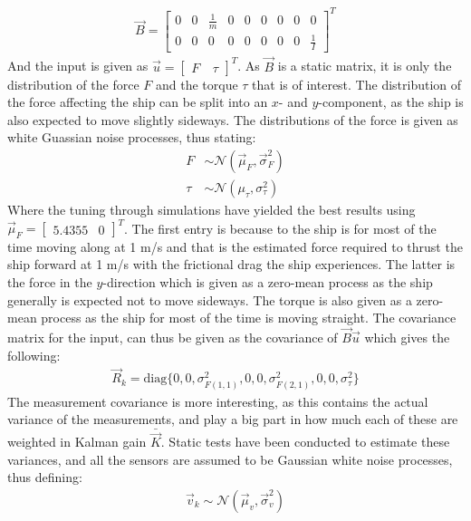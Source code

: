 \documentclass{ifacconf}
\begin{document}
\begin{align}
\vec{B} = \begin{bmatrix}
0 & 0 & \frac{1}{m} & 0 & 0 & 0 & 0 & 0 & 0\\
0 & 0 & 0 & 0 & 0 & 0 & 0 & 0 & \frac{1}{I} \end{bmatrix}^T
\end{align} 
And the input is given as $\vec{u} = \begin{bmatrix}F\ & \tau\end{bmatrix}^T$. As $\vec{B}$ is a static matrix, it is only the distribution of the force $F$ and the torque $\tau$ that is of interest. The distribution of the force affecting the ship can be split into an $x$- and $y$-component, as the ship is also expected to move slightly sideways. The distributions of the force is given as white Guassian noise processes, thus stating:
\begin{align}
F&\sim \mathcal{N}(\vec{\mu}_F,\vec{\sigma}^2_F)\\
\tau&\sim \mathcal{N}(\mu_\tau,\sigma^2_\tau)
\end{align}
Where the tuning through simulations have yielded the best results using $\vec{\mu}_F = \begin{bmatrix}5.4355 & 0\end{bmatrix}^T$. The first entry is because to the ship is for most of the time moving along at 1 m/s and that is the estimated force required to thrust the ship forward at 1 m/s with the frictional drag the ship experiences. The latter is the force in the $y$-direction which is given as a zero-mean process as the ship generally is expected not to move sideways. The torque is also given as a zero-mean process as the ship for most of the time is moving straight. The covariance matrix for the input, can thus be given as the covariance of $\vec{B}\vec{u}$ which gives the following:
\begin{align}
\vec{R}_k = \text{diag}\{0,0,\sigma^2_{F(1,1)},0,0,\sigma^2_{F(2,1)},0,0,\sigma^2_\tau\}
\end{align}
The measurement covariance is more interesting, as this contains the actual variance of the measurements, and play a big part in how much each of these are weighted in Kalman gain $\bar{\vec{K}}$. Static tests have been conducted to estimate these variances, and all the sensors are assumed to be Gaussian white noise processes, thus defining:
\begin{align}
\vec{v}_k  \sim \mathcal{N}(\vec{\mu}_v,\vec{\sigma}^2_{v})
\end{align}
\end{document}
